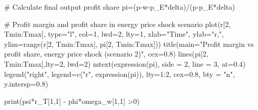 \documentclass[
  letterpaper,
  DIV=11,
  numbers=noendperiod]{scrreprt}
\newenvironment{Shaded}{\begin{snugshade}}{\end{snugshade}}
\newcommand{\AttributeTok}[1]{\textcolor[rgb]{0.40,0.45,0.13}{#1}}
\newcommand{\CommentTok}[1]{\textcolor[rgb]{0.37,0.37,0.37}{#1}}
\newcommand{\DecValTok}[1]{\textcolor[rgb]{0.68,0.00,0.00}{#1}}
\newcommand{\FloatTok}[1]{\textcolor[rgb]{0.68,0.00,0.00}{#1}}
\newcommand{\FunctionTok}[1]{\textcolor[rgb]{0.28,0.35,0.67}{#1}}
\newcommand{\NormalTok}[1]{\textcolor[rgb]{0.00,0.23,0.31}{#1}}
\newcommand{\OtherTok}[1]{\textcolor[rgb]{0.00,0.23,0.31}{#1}}
\newcommand{\SpecialCharTok}[1]{\textcolor[rgb]{0.37,0.37,0.37}{#1}}
\newcommand{\StringTok}[1]{\textcolor[rgb]{0.13,0.47,0.30}{#1}}
\begin{document}
\begin{Shaded}
\begin{Highlighting}[]
\CommentTok{\# Calculate final output profit share}
\NormalTok{pi}\OtherTok{=}\NormalTok{(p}\SpecialCharTok{{-}}\NormalTok{w}\SpecialCharTok{{-}}\NormalTok{p\_E}\SpecialCharTok{*}\NormalTok{delta)}\SpecialCharTok{/}\NormalTok{(p}\SpecialCharTok{{-}}\NormalTok{p\_E}\SpecialCharTok{*}\NormalTok{delta)}

\CommentTok{\# Profit margin and profit share in energy price shock scenario}
\FunctionTok{plot}\NormalTok{(r[}\DecValTok{2}\NormalTok{, Tmin}\SpecialCharTok{:}\NormalTok{Tmax], }\AttributeTok{type=}\StringTok{"l"}\NormalTok{, }\AttributeTok{col=}\DecValTok{1}\NormalTok{, }\AttributeTok{lwd=}\DecValTok{2}\NormalTok{, }\AttributeTok{lty=}\DecValTok{1}\NormalTok{, }\AttributeTok{xlab=}\StringTok{"Time"}\NormalTok{, }\AttributeTok{ylab=}\StringTok{"r,"}\NormalTok{, }\AttributeTok{ylim=}\FunctionTok{range}\NormalTok{(r[}\DecValTok{2}\NormalTok{, Tmin}\SpecialCharTok{:}\NormalTok{Tmax], pi[}\DecValTok{2}\NormalTok{, Tmin}\SpecialCharTok{:}\NormalTok{Tmax])) }
\FunctionTok{title}\NormalTok{(}\AttributeTok{main=}\StringTok{"Profit margin vs profit share, energy price shock (scenario 2)"}\NormalTok{, }\AttributeTok{cex=}\FloatTok{0.8}\NormalTok{)}
\FunctionTok{lines}\NormalTok{(pi[}\DecValTok{2}\NormalTok{, Tmin}\SpecialCharTok{:}\NormalTok{Tmax],}\AttributeTok{lty=}\DecValTok{2}\NormalTok{, }\AttributeTok{lwd=}\DecValTok{2}\NormalTok{)}
\FunctionTok{mtext}\NormalTok{(}\FunctionTok{expression}\NormalTok{(pi), }\AttributeTok{side =} \DecValTok{2}\NormalTok{, }\AttributeTok{line =} \DecValTok{3}\NormalTok{, }\AttributeTok{at=}\FloatTok{0.4}\NormalTok{)}
\FunctionTok{legend}\NormalTok{(}\StringTok{"right"}\NormalTok{, }\AttributeTok{legend=}\FunctionTok{c}\NormalTok{(}\StringTok{"r"}\NormalTok{, }\FunctionTok{expression}\NormalTok{(pi)),}
       \AttributeTok{lty=}\DecValTok{1}\SpecialCharTok{:}\DecValTok{2}\NormalTok{, }\AttributeTok{cex=}\FloatTok{0.8}\NormalTok{, }\AttributeTok{bty =} \StringTok{"n"}\NormalTok{, }\AttributeTok{y.intersp=}\FloatTok{0.8}\NormalTok{)}


\FunctionTok{print}\NormalTok{(psi}\SpecialCharTok{*}\NormalTok{r\_T[}\DecValTok{1}\NormalTok{,}\DecValTok{1}\NormalTok{] }\SpecialCharTok{{-}}\NormalTok{ phi}\SpecialCharTok{*}\NormalTok{omega\_w[}\DecValTok{1}\NormalTok{,}\DecValTok{1}\NormalTok{] }\SpecialCharTok{\textgreater{}}\DecValTok{0}\NormalTok{)}
\end{Highlighting}
\end{Shaded}
\end{document}
